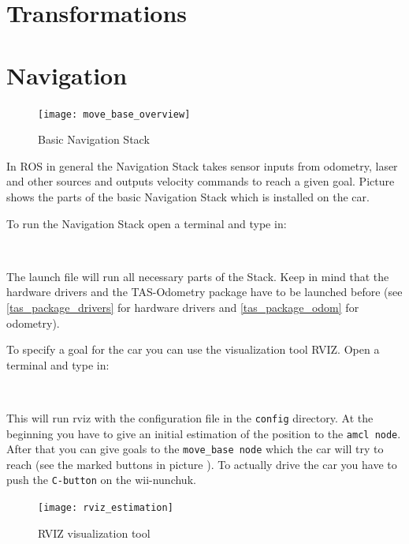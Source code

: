 
\section{Transformations}
\label{sec:tas_package_transformations}

\newpage
\section{Navigation}
\label{sec:tas_package_navigation}

\begin{figure}[h]
	\centering
		\texttt{[image: move\_base\_overview]}
	\caption{Basic Navigation Stack}
	\label{fig:move_base_overview}
\end{figure}

In ROS in general the Navigation Stack takes sensor inputs from odometry, laser and other sources and outputs velocity commands to reach a given goal. Picture  shows the parts of the basic Navigation Stack which is installed on the car.

To run the Navigation Stack open a terminal and type in:

\\

The launch file will run all necessary parts of the Stack. Keep in mind that the hardware drivers and the TAS-Odometry package have to be launched before (see \ref{tas_package_drivers} for hardware drivers and \ref{tas_package_odom} for odometry).

To specify a goal for the car you can use the visualization tool RVIZ. Open a terminal and type in:

 \\

This will run rviz with the configuration file in the \texttt{config} directory. At the beginning you have to give an initial estimation of the position to the \texttt{amcl node}. After that you can give goals to the \texttt{move\_base node} which the car will try to reach (see the marked buttons in picture ). To actually drive the car you have to push the \texttt{C-button} on the wii-nunchuk. 

\begin{figure}[h]
	\centering
		\texttt{[image: rviz\_estimation]}
	\caption{RVIZ visualization tool}
	\label{fig:rviz_estimation}
\end{figure}


